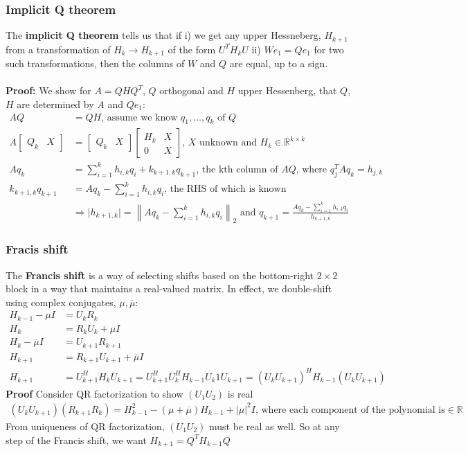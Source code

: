 \documentclass{article}
\newcommand{\norm}[2]{\left\lVert#1\right\rVert_#2}
\newcommand{\abs}[1]{\lvert#1\rvert}
\begin{document}
\subsubsection{Implicit Q theorem}
The \textbf{implicit Q theorem} tells us that if i) we get any upper Hessneberg, $H_{k+1}$ from a transformation of $H_k \rightarrow H_{k+1}$ of the form $U^TH_kU$ ii) $We_1 = Qe_1$ for two such transformations, then the columns of $W$ and $Q$ are equal, up to a sign.\\ \\
\textbf{Proof:} We show for $A = QHQ^T$, $Q$ orthogonal and $H$ upper Hessenberg, that $Q$, $H$ are determined by $A$ and $Qe_1$:
\begin{align*}
    AQ & = QH \textrm{, assume we know } q_1, \dots, q_k \textrm{ of } Q \\
    A \begin{bmatrix} Q_k & X \end{bmatrix} &= 
        \begin{bmatrix} Q_k & X \end{bmatrix} 
        \begin{bmatrix} H_k & X \\ 0 & X \end{bmatrix} \textrm{, $X$ unknown and } H_k \in \mathbb{R}^{k \times k}\\
    Aq_k &= \sum_{i=1}^kh_{i,k}q_i + k_{k+1,k}q_{k+1} \textrm{, the kth column of $AQ$, where } q_j^TAq_k = h_{j,k}\\
    k_{k+1,k}q_{k+1} &= Aq_k - \sum_{i=1}^kh_{i,k}q_i \textrm{, the RHS of which is known}\\
    &\Rightarrow \abs{h_{k+1,k}} = \norm{Aq_k - \sum_{i=1}^kh_{i,k}q_i}{2} \textrm{ and } q_{k+1} = \frac{Aq_k - \sum_{i=1}^kh_{i,k}q_i}{h_{k+1,k}}
\end{align*}

\subsubsection{Fracis shift}
The \textbf{Francis shift} is a way of selecting shifts based on the bottom-right $2\times 2$ block in a way that maintains a real-valued matrix. In effect, we double-shift using complex conjugates, $\mu, \overline{\mu}$:
\begin{align*}
    H_{k-1} - \mu I &= U_kR_k\\
    H_k &= R_kU_k + \mu I\\
    H_k - \overline{\mu}I &= U_{k+1}R_{k+1}\\
    H_{k+1} &= R_{k+1}U_{k+1} + \overline{\mu}I\\
    H_{k+1} &= U^H_{k+1}H_kU_{k+1} = U^H_{k+1}U^H_kH_{k-1}U_k1U_{k+1} = (U_kU_{k+1})^HH_{k-1}(U_kU_{k+1})
\end{align*}
\textbf{Proof} Consider QR factorization to show $(U_1U_2)$ is real
\begin{align*}
    (U_kU_{k+1})(R_{k+1}R_k) = H_{k-1}^2 - (\mu + \overline{\mu})H_{k-1} + \abs{\mu}^2I \textrm{, where each component of the polynomial is} \in \mathbb{R}
\end{align*}
From uniqueness of QR factorization, $(U_1U_2)$ must be real as well. So at any step of the Francis shift, we want $H_{k+1} = Q^TH_{k-1}Q$
\end{document}
